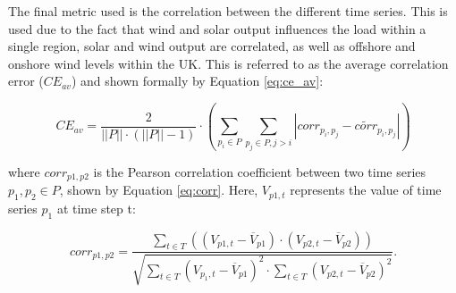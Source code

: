 The final metric used is the correlation between the different time series. This is used due to the fact that wind and solar output influences the load within a single region, solar and wind output are correlated, as well as offshore and onshore wind levels within the UK. This is referred to as the average correlation error ($CE_{av}$) and shown formally by Equation \ref{eq:ce_av}:


\begin{equation}
\label{eq:ce_av}
CE_{av}=\frac{2}{\left|\left|P\right|\right|\cdot(\left|\left|P\right|\right|-1)}\cdot
\left(
\sum\limits_{p_i\in P}\sum\limits_{p_j\in P,j>i}
\left|
corr_{p_i,p_j}-\widetilde{corr}_{p_i,p_j}
\right|
\right)
\end{equation}

\noindent where $corr_{p1,p2}$ is the Pearson correlation coefficient between two time series $p_1,p_2\in P$, shown by Equation \ref{eq:corr}. Here, $V_{p1,t}$ represents the value of time series $p_1$ at time step t:

\begin{equation}
\label{eq:corr}
corr_{p1,p2}=\frac
{\sum\limits_{t\in T}\left(\left(V_{p1,t}-\overline{V}_{p1}\right)\cdot\left(V_{p2,t}-\overline{V}_{p2}\right)\right)}
{\sqrt{
		\sum\limits_{t\in T} \left(V_{p_1,t}-\overline{V}_{p1}\right)^2\cdot\sum\limits_{t\in T}\left(V_{p2,t}-\overline{V}_{p2}\right)^2
}}.
\end{equation}













